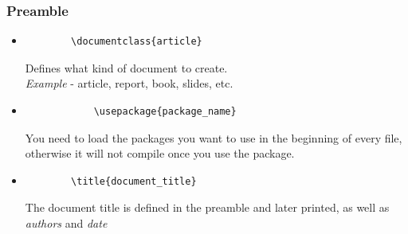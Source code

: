 \documentclass{beamer}
\begin{document}

\begin{frame}[fragile]
		\frametitle{Preamble}
		\begin{itemize}
		\item<1->\begin{verbatim}
		\documentclass{article}
		\end{verbatim}
		Defines what kind of document to create. \\ \textit{Example} - article, report, book, slides, etc.
		\item<2->\begin{verbatim}
			\usepackage{package_name}
		\end{verbatim}
		You need to load the packages you want to use in the beginning of every file, otherwise it will not compile once you use the package.
		\item<3->\begin{verbatim}
		\title{document_title}
		\end{verbatim}
		The document title is defined in the preamble and later printed, as well as \textit{authors} and \textit{date}
		\end{itemize}
\end{frame}
\end{document}
